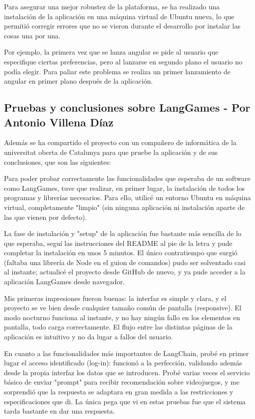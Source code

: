 Para asegurar una mejor robustez de la plataforma, se ha realizado una instalación de la aplicación en una máquina virtual de Ubuntu nueva, lo que permitió corregir errores que no se vieron durante el desarrollo por instalar las cosas una por una. 

Por ejemplo, la primera vez que se lanza angular se pide al usuario que especifique ciertas preferencias, pero al lanzarse en segundo plano el usuario no podía elegir. Para paliar este problema se realiza un primer lanzamiento de angular en primer plano después de la aplicación.

\subsection{Pruebas y conclusiones sobre LangGames - Por Antonio Villena Díaz}

Además se ha compartido el proyecto con un compañero de informática de la universitat oberta de Catalunya para que pruebe la aplicación y de sus conclusiones, que son las siguientes: 

Para poder probar correctamente las funcionalidades que esperaba de un software como LangGames, tuve que realizar, en primer lugar, la instalación de todos los programas y librerías necesarios. Para ello, utilicé un entorno Ubuntu en máquina virtual, completamente "limpio" (sin ninguna aplicación ni instalación aparte de las que vienen por defecto).

La fase de instalación y "setup" de la aplicación fue bastante más sencilla de lo que esperaba, seguí las instrucciones del README al pie de la letra y pude completar la instalación en unos 5 minutos. El único contratiempo que surgió (faltaba una librería de Node en el guion de comandos) pudo ser solventado casi al instante; actualicé el proyecto desde GitHub de nuevo, y ya pude acceder a la aplicación LangGames desde navegador.

Mis primeras impresiones fueron buenas: la interfaz es simple y clara, y el proyecto se ve bien desde cualquier tamaño común de pantalla (responsive). El modo nocturno funciona al instante, y no hay ningún fallo en los elementos en pantalla, todo carga correctamente. El flujo entre las distintas páginas de la aplicación es intuitivo y no da lugar a fallos del usuario.

En cuanto a las funcionalidades más importantes de LangChain, probé en primer lugar el acceso identificado (log-in): funcionó a la perfección, validando además desde la propia interfaz los datos que se introducen. Probé varias veces el servicio básico de enviar "prompt" para recibir recomendación sobre videojuegos, y me sorprendió que la respuesta se adaptara en gran medida a las restricciones y especificaciones que di. La única pega que vi en estas pruebas fue que el sistema tarda bastante en dar una respuesta.

